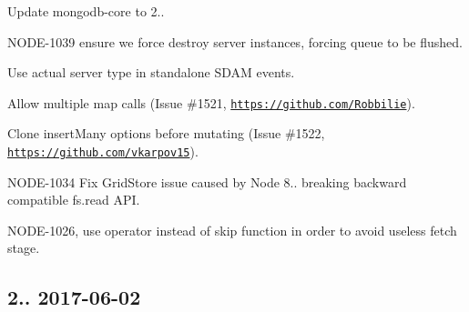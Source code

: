 \begin{DoxyItemize}
\item Update mongodb-\/core to 2..
\begin{DoxyItemize}
\item N\+O\+D\+E-\/1039 ensure we force destroy server instances, forcing queue to be flushed.
\item Use actual server type in standalone S\+D\+AM events.
\end{DoxyItemize}
\item Allow multiple map calls (Issue \#1521, \href{https://github.com/Robbilie}{\tt https\+://github.\+com/\+Robbilie}).
\item Clone insert\+Many options before mutating (Issue \#1522, \href{https://github.com/vkarpov15}{\tt https\+://github.\+com/vkarpov15}).
\item N\+O\+D\+E-\/1034 Fix Grid\+Store issue caused by Node 8.. breaking backward compatible fs.\+read A\+PI.
\item N\+O\+D\+E-\/1026, use operator instead of skip function in order to avoid useless fetch stage.
\end{DoxyItemize}

\subsection*{2.. 2017-\/06-\/02 }


